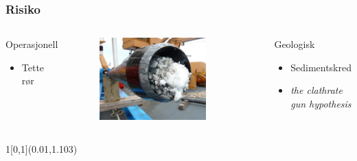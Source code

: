 \documentclass[utf8x, notes, graphics]{beamer}
\newcommand{\myref}[1]{%
\begin{textblock}{1}[0,1](0.01,1.103)
\tiny{\color{myGray}{#1}}
\end{textblock}}
\begin{document}
\begin{frame}
\frametitle{Risiko}
\begin{columns}[T]
\begin{block}{Operasjonell}
\begin{itemize}
\item Tette rør
\end{itemize}
\end{block}

\begin{figure}
\includegraphics[width=0.8\textwidth]{../pictures/pipe_plug.pdf}
\end{figure}

\begin{block}{Geologisk}
\begin{itemize}
\item Sedimentskred
\item \emph{the clathrate gun hypothesis}
\end{itemize}
\end{block}
\end{columns}
\myref{Figur: https://www.youtube.com/watch?v=nUluhIa-hzA}
\end{frame}
\end{document}
